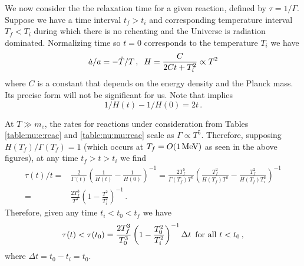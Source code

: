 We now consider the the relaxation time for a given reaction, defined by $\tau=1/\Gamma$. Suppose we have a time interval $t_f>t_i$ and corresponding temperature interval $T_f<T_i$ during which there is no reheating and the Universe is radiation dominated. Normalizing time so $t=0$ corresponds to the temperature $T_i$ we have
\begin{equation}\label{ch6:Heq}
\dot a/a=-\dot T/T\,,\hspace{2mm} H=\frac{C}{2Ct+T_i^2}\propto T^2
\end{equation}
where $C$ is a constant that depends on the energy density and the Planck mass. Its precise form will not be significant for us. Note that  implies
\begin{equation}
1/H(t)-1/H(0)=2t\,.
\end{equation}

At $T\gg m_e$, the rates for reactions under consideration from Tables \ref{table:nu:e:reac} and \ref{table:nu:mu:reac} scale as $\Gamma\propto T^5$. Therefore, supposing $H(T_f)/\Gamma(T_f)=1$ (which occurs at $T_f=O(1\text{\,MeV})$ as seen in the above figures), at any time $t_f>t>t_i$ we find 
\begin{align}\label{relaxTime}
\tau(t)/t=&\frac{2}{\Gamma(t)}\left(\frac{1}{H(t)}-\frac{1}{H(0)}\right)^{-1}=\frac{2T_f^5}{\Gamma(T_f)T^5}\left(\frac{T_f^2}{H(T_f)T^2}-\frac{T_f^2}{H(T_f)T_i^2}\right)^{-1}\\
=&\frac{2T_f^3}{T^3}\left(1-\frac{T^2}{T_i^2}\right)^{-1}\,.
\end{align}
Therefore, given any time $t_i<t_0<t_f$ we have
\begin{equation}\label{ch6:tauEq}
\tau(t)<\tau(t_0)=\frac{2T_f^3}{T_0^3}\left(1-\frac{T_0^2}{T_i^2}\right)^{-1}\Delta t \text{ \,for all } t<t_0\,,
\end{equation}
where $\Delta t=t_0-t_i=t_0$.


